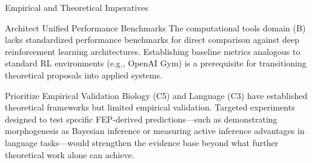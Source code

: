 \documentclass[
  ignorenonframetext,
]{beamer}
\begin{document}
\begin{frame}{Empirical and Theoretical Imperatives}
\protect{}\label{empirical-and-theoretical-imperatives}
\begin{block}{Architect Unified Performance Benchmarks}
\protect{}\label{architect-unified-performance-benchmarks}
The computational tools domain (B) lacks standardized performance
benchmarks for direct comparison against deep reinforcement learning
architectures. Establishing baseline metrics analogous to standard RL
environments (e.g., OpenAI Gym) is a prerequisite for transitioning
theoretical proposals into applied systems.
\end{block}

\begin{block}{Prioritize Empirical Validation}
\protect{}\label{prioritize-empirical-validation}
Biology (C5) and Language (C3) have established theoretical frameworks
but limited empirical validation. Targeted experiments designed to test
specific FEP-derived predictions---such as demonstrating morphogenesis
as Bayesian inference or measuring active inference advantages in
language tasks---would strengthen the evidence base beyond what further
theoretical work alone can achieve.
\end{block}
\end{frame}
\end{document}
